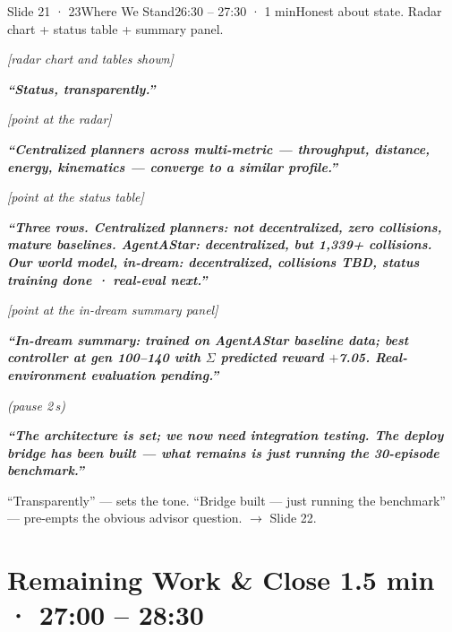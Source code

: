 \documentclass[11pt,a4paper]{article}
\newcommand{\say}[1]{%
    \par\vspace{0.3em}%
    \begingroup
    \leftskip=12pt
    \rightskip=8pt
    \color{thStrong}%
    \itshape\textbf{“#1”}%
    \par
    \endgroup
    \vspace{0.2em}
}
\newcommand{\beat}[1][2]{%
    \par\textcolor{thMuted}{\small\textit{(pause #1\,s)}}\par
    \vspace{0.2em}
}
\newcommand{\stage}[1]{%
    \par\textcolor{thMuted}{\small\textit{[#1]}}\par
    \vspace{0.2em}
}
\newcommand{\emphw}[1]{\textbf{\textcolor{thAmber}{#1}}}
\begin{document}
\begin{slide}{Slide 21 · 23}{Where We Stand}{26:30 – 27:30 · 1 min}{Honest about state. Radar chart + status table + summary panel.}
\stage{radar chart and tables shown}

\say{Status, transparently.}

\stage{point at the radar}

\say{Centralized planners across multi-metric — throughput, distance, energy, kinematics — converge to a similar profile.}

\stage{point at the status table}

\say{Three rows. \textbf{Centralized planners}: not decentralized, zero collisions, mature baselines. \textbf{AgentAStar}: decentralized, but \textbf{1{,}339+ collisions}. \emphw{Our world model, in-dream}: decentralized, collisions \textbf{TBD}, status \textbf{training done · real-eval next}.}

\stage{point at the in-dream summary panel}

\say{In-dream summary: trained on AgentAStar baseline data; best controller at gen 100–140 with $\Sigma$ predicted reward \textbf{$+$7.05}. Real-environment evaluation pending.}
\beat
\say{The architecture is set; we now need integration testing. \emphw{The deploy bridge has been built — what remains is just running the 30-episode benchmark.}}

\begin{stagebox}
``Transparently'' — sets the tone. ``Bridge built — just running the benchmark'' — pre-empts the obvious advisor question. $\rightarrow$ Slide 22.
\end{stagebox}
\end{slide}

\section{Remaining Work \& Close \hfill \textcolor{thMuted}{\small 1.5 min · 27:00 – 28:30}}
\end{document}
